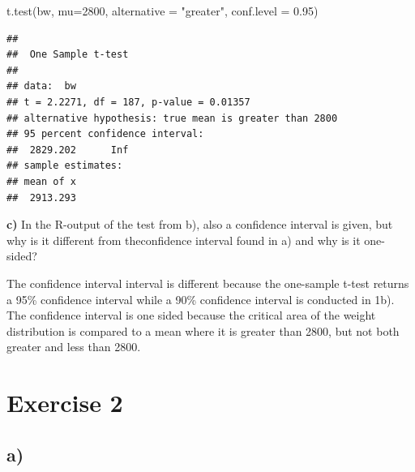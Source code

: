 \documentclass[
]{article}
\newenvironment{Shaded}{\begin{snugshade}}{\end{snugshade}}
\newcommand{\AttributeTok}[1]{\textcolor[rgb]{0.77,0.63,0.00}{#1}}
\newcommand{\DecValTok}[1]{\textcolor[rgb]{0.00,0.00,0.81}{#1}}
\newcommand{\FloatTok}[1]{\textcolor[rgb]{0.00,0.00,0.81}{#1}}
\newcommand{\FunctionTok}[1]{\textcolor[rgb]{0.00,0.00,0.00}{#1}}
\newcommand{\NormalTok}[1]{#1}
\newcommand{\StringTok}[1]{\textcolor[rgb]{0.31,0.60,0.02}{#1}}
\begin{document}
\begin{Shaded}
\begin{Highlighting}[]
\FunctionTok{t.test}\NormalTok{(bw, }\AttributeTok{mu=}\DecValTok{2800}\NormalTok{, }\AttributeTok{alternative =} \StringTok{"greater"}\NormalTok{, }\AttributeTok{conf.level =} \FloatTok{0.95}\NormalTok{)}
\end{Highlighting}
\end{Shaded}

\begin{verbatim}
## 
##  One Sample t-test
## 
## data:  bw
## t = 2.2271, df = 187, p-value = 0.01357
## alternative hypothesis: true mean is greater than 2800
## 95 percent confidence interval:
##  2829.202      Inf
## sample estimates:
## mean of x 
##  2913.293
\end{verbatim}

\textbf{c)} In the R-output of the test from b), also a confidence
interval is given, but why is it different from theconfidence interval
found in a) and why is it one-sided?

The confidence interval interval is different because the one-sample
t-test returns a 95\% confidence interval while a 90\% confidence
interval is conducted in 1b). The confidence interval is one sided
because the critical area of the weight distribution is compared to a
mean where it is greater than 2800, but not both greater and less than
2800.

\hypertarget{exercise-2}{%
\section{Exercise 2}\label{exercise-2}}

\hypertarget{a}{%
\subsection{a)}\label{a}}
\end{document}
